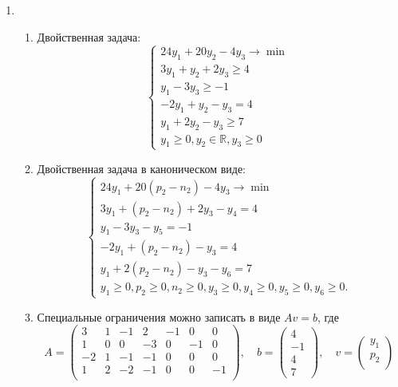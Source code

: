 \documentclass[12pt]{article}
\newcommand \RR{\mathbb{R}}
\begin{document}
\begin{enumerate}
    \item 
    \begin{enumerate}
      \item  Двойственная задача:
      \[
      \begin{cases}
          24y_1 + 20y_2 -4 y_3 \to \min \\
          3y_1 + y_2 +2 y_3 \geq 4 \\
          y_1 -3y_3 \geq -1 \\
          -2y_1 + y_2 -y_3 = 4 \\
          y_1 + 2y_2 - y_3 \geq 7 \\
          y_1 \geq 0, y_2 \in \RR, y_3 \geq 0 
      \end{cases}
      \]
      \item Двойственная задача в каноническом виде:
      \[
      \begin{cases}
          24y_1 + 20(p_2 - n_2) -4 y_3 \to \min \\
          3y_1 + (p_2 - n_2) +2 y_3 - y_4 = 4 \\
          y_1 -3y_3 - y_5 = -1 \\
          -2y_1 + (p_2 - n_2) -y_3 = 4 \\
          y_1 + 2(p_2 - n_2) - y_3 - y_6 = 7 \\
          y_1 \geq 0, p_2 \geq 0, n_2 \geq 0, y_3 \geq 0, y_4 \geq 0, y_5 \geq 0, y_6 \geq 0.
      \end{cases}
      \]
      \item Специальные ограничения можно записать в виде $A v = b$, 
      где 
      \[
      A = \begin{pmatrix}
        3 & 1 & -1 & 2 & -1 & 0 & 0 \\
        1 & 0 & 0  & -3 & 0 & -1 & 0 \\
        -2 & 1 & -1 & -1 & 0 & 0 & 0 \\
        1 & 2 & -2 & -1 & 0 & 0 & -1 \\
      \end{pmatrix}, \quad
      b = \begin{pmatrix}
        4\\
        -1 \\
        4 \\
        7
      \end{pmatrix}, \quad 
      v = \begin{pmatrix}
        y_1 \\
        p_2 \\

\end{pmatrix}\]
\end{enumerate}
\end{enumerate}
\end{document}
